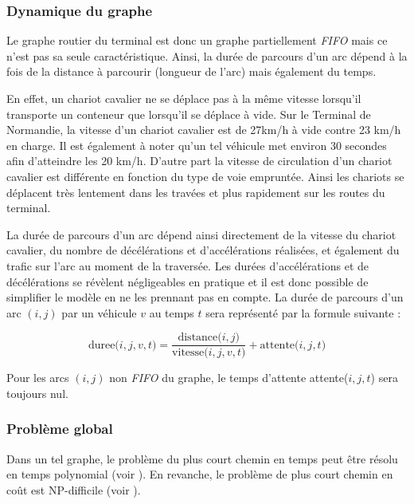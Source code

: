 \subsubsection{Dynamique du graphe}

Le graphe routier du terminal est donc un graphe partiellement \textit{FIFO} mais ce n'est pas sa seule caractéristique. Ainsi, la durée de parcours d'un arc dépend à la fois de la distance à parcourir (longueur de l'arc) mais également du temps. 

En effet, un chariot cavalier ne se déplace pas à la même vitesse lorsqu'il transporte un conteneur que lorsqu'il se déplace à vide.
Sur le Terminal de Normandie, la vitesse d'un chariot cavalier est de 27km/h à vide contre 23 km/h en charge. 
Il est également à noter qu'un tel véhicule met environ 30 secondes afin d'atteindre les 20 km/h. 
D'autre part la vitesse de circulation d'un chariot cavalier est différente en fonction du type de voie empruntée. 
Ainsi les chariots se déplacent très lentement dans les travées et plus rapidement sur les routes du terminal.

La durée de parcours d'un arc dépend ainsi directement de la vitesse du chariot cavalier, du nombre de décélérations et d'accélérations réalisées, et également du trafic sur l'arc au moment de la traversée.
Les durées d'accélérations et de décélérations se révèlent négligeables en pratique et il est donc possible de simplifier le modèle en ne les prennant pas en compte. La durée de parcours d'un arc $(i,j)$ par un véhicule $v$ au temps $t$ sera représenté par la formule suivante : 

\begin{equation}
 \text{duree(}i,j,v,t\text{)}  = \frac{\text{distance(}i,j\text{)}}{\text{vitesse(}i,j,v,t\text{)}} + \text{attente(}i,j,t\text{)}
 \label{eq:optTerminaux:duree}
\end{equation}

Pour les arcs $(i,j)$ non \textit{FIFO} du graphe, le temps d'attente attente($i,j,t$) sera toujours nul.

\subsubsection{Problème global}

Dans un tel graphe, le problème du plus court chemin en temps peut être résolu en temps polynomial (voir \cite{Orda1990}). 
En revanche, le problème de plus court chemin en coût est NP-difficile (voir \cite{Ahuja2003}). 

